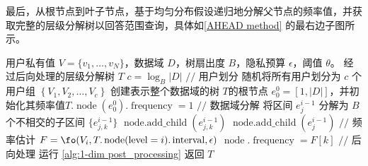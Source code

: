 最后，从根节点到叶子节点，\myahead 基于均匀分布假设递归地分解父节点的频率值，并获取完整的层级分解树以回答范围查询，具体如\autoref{AHEAD method} 的最右边子图所示。

\begin{algorithm}[!htbp]
	\begin{algorithmic}[1]
        \REQUIRE 用户私有值 $V=\{v_1, \ldots, v_N\}$，数据域 $D$，树扇出度 $B$，隐私预算 $\epsilon$，阈值 $\theta$。
        \ENSURE 经过后向处理的\myahead 层级分解树 $T$
		\STATE $c = {\log_B}|D|$
		\STATE $//$ 用户划分
        \STATE 随机将所有用户划分为 $c$ 个用户组 $\left\{ V_1, V_2, \ldots, V_c \right\}$
        \STATE 创建表示整个数据域的树 $T$的根节点 $e^0_0 = [1, |D|]$，并初始化其频率值$T.\operatorname{node}(e^0_0).\operatorname{frequency} = 1$
            \STATE $//$ 数据域分解
            \STATE 将区间 $e^{i-1}_j$ 分解为 $B$ 个不相交的子区间 $\{e^{i-1}_{j,k}\}$
    		\STATE $\operatorname{node.add\_child}(e^{i-1}_{j,k})$
            \ENDFOR
            \ELSE
            \STATE $\operatorname{node.add\_child}(e^{i-1}_{j})$
            \ENDIF    		
            \ENDFOR
            \STATE $//$ 频率估计
            \STATE $F = \fo(V_i, T.\operatorname{node}(\operatorname{level}=i).\operatorname{interval}, \epsilon)$
    		\STATE $\operatorname{node}.\operatorname{frequency} = F[k]$
            \ENDFOR
        \ENDFOR
        \STATE $//$ 后向处理
        \STATE 运行 \autoref{alg:1-dim post_processing}
        \STATE 返回 $T$
	\end{algorithmic}
    \caption{构建一维\myahead 层级分解树}
    \label{Construct 1-dim prototype tree}
\end{algorithm}

